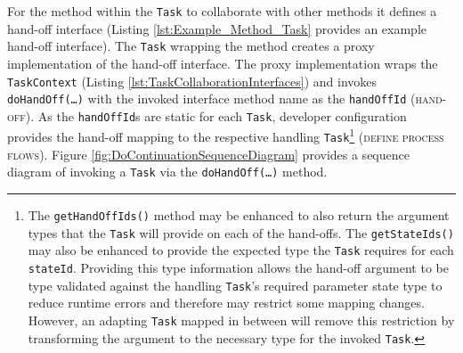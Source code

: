 \documentclass[prodmode]{style/acmlarge}
\begin{document}
For the method within the \texttt{Task} to collaborate with other methods it
defines a hand-off interface (Listing \ref{lst:Example_Method_Task} provides an
example hand-off interface).  The \texttt{Task} wrapping the method creates a
proxy implementation of the hand-off interface.  The proxy implementation wraps
the \texttt{TaskContext} (Listing \ref{lst:TaskCollaborationInterfaces}) and
invokes \texttt{doHandOff(\ldots)} with the invoked interface method name as the
\texttt{handOffId} (\textsc{hand-off}).  As the \texttt{handOffId}s are static
for each \texttt{Task}, developer configuration provides the hand-off mapping to
the respective handling \texttt{Task}\footnote{The \texttt{getHandOffIds()}
method may be enhanced to also return the argument types that the \texttt{Task}
will provide on each of the hand-offs.  The \texttt{getStateIds()} may also be
enhanced to provide the expected type the \texttt{Task} requires for each
\texttt{stateId}. Providing this type information allows the hand-off argument
to be type validated against the handling \texttt{Task}'s required parameter
state type to reduce runtime errors and therefore may restrict some mapping
changes.  However, an adapting \texttt{Task} mapped in between will remove this
restriction by transforming the argument to the necessary type for the invoked
\texttt{Task}.} (\textsc{define process flows}).  Figure
\ref{fig:DoContinuationSequenceDiagram} provides a sequence diagram of invoking
a \texttt{Task} via the \texttt{doHandOff(\ldots)} method.
\end{document}
